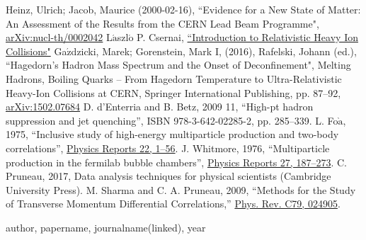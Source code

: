 \begin{thebibliography}{50}
 Heinz, Ulrich; Jacob, Maurice (2000-02-16), ``Evidence for a New State of Matter: An Assessment of the Results from the CERN Lead Beam Programme", \href{https://arxiv.org/abs/nucl-th/0002042}{arXiv:nucl-th/0002042}
 L$\acute{\mathrm{a}}$szl$\acute{\mathrm{o}}$ P. Csernai, \href{http://www.csernai.no/Csernai-textbook.pdf}{``Introduction to Relativistic Heavy Ion Collisions"}
 Ga$\acute{\mathrm{z}}$dzicki, Marek; Gorenstein, Mark I, (2016), Rafelski, Johann (ed.), ``Hagedorn's Hadron Mass Spectrum and the Onset of Deconfinement", Melting Hadrons, Boiling Quarks – From Hagedorn Temperature to Ultra-Relativistic Heavy-Ion Collisions at CERN, Springer International Publishing, pp. 87–92, \href{https://arxiv.org/abs/1502.07684}{arXiv:1502.07684}
 D. d’Enterria and B. Betz, 2009 11, ``High-pt hadron suppression and jet quenching”, ISBN 978-3-642-02285-2, pp. 285–339.
 L. Fo$\grave{\mathrm{a}}$, 1975, ``Inclusive study of high-energy multiparticle production and two-body correlations”, \href{http://dx.doi.org/https://doi.org/10.1016/0370-1573(75)90050-2}{Physics Reports 22, 1–56}.
 J. Whitmore, 1976, ``Multiparticle production in the fermilab bubble chambers”, \href{http://dx.doi.org/https://doi.org/10.1016/0370-1573(76)90004-1}{Physics Reports 27, 187–273}.
 C. Pruneau, 2017, Data analysis techniques for physical scientists (Cambridge University Press).
  M. Sharma and C. A. Pruneau, 2009, “Methods for the Study of Transverse Momentum Differential Correlations,” \href{https://journals.aps.org/prc/abstract/10.1103/PhysRevC.79.024905}{Phys. Rev. C79, 024905}.
\end{thebibliography}


author, papername, journalname(linked), year
